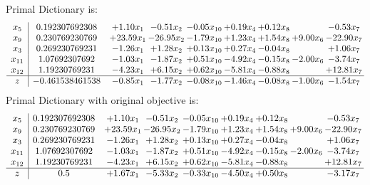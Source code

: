 \documentclass[9pt]{article}
\begin{document}
Primal Dictionary is:
\[\begin{array}{c| c c@{\hskip 2pt} c@{\hskip 2pt} c@{\hskip 2pt} c@{\hskip 2pt} c@{\hskip 2pt} c@{\hskip 2pt} c@{\hskip 2pt} }
 x_{5}   &  0.192307692308 & +  1.10 x_{1} & -0.51 x_{2} & -0.05 x_{10} & +  0.19 x_{4} & +  0.12 x_{8} &   & -0.53 x_{7}\\
 x_{9}   &  0.230769230769 & + 23.59 x_{1} & -26.95 x_{2} & -1.79 x_{10} & +  1.23 x_{4} & +  1.54 x_{8} & +  9.00 x_{6} & -22.90 x_{7}\\
 x_{3}   &  0.269230769231 & -1.26 x_{1} & +  1.28 x_{2} & +  0.13 x_{10} & +  0.27 x_{4} & -0.04 x_{8} &   & +  1.06 x_{7}\\
 x_{11}   &  1.07692307692 & -1.03 x_{1} & -1.87 x_{2} & +  0.51 x_{10} & -4.92 x_{4} & -0.15 x_{8} & -2.00 x_{6} & -3.74 x_{7}\\
 x_{12}   &  1.19230769231 & -4.23 x_{1} & +  6.15 x_{2} & +  0.62 x_{10} & -5.81 x_{4} & -0.88 x_{8} &   & + 12.81 x_{7}\\
\hline
z    &  -0.461538461538 & -0.85 x_{1} & -1.77 x_{2} & -0.08 x_{10} & -1.46 x_{4} & -0.08 x_{8} & -1.00 x_{6} & -1.54 x_{7}\\
\end{array}\]
Primal Dictionary with original objective is:
\[\begin{array}{c| c c@{\hskip 2pt} c@{\hskip 2pt} c@{\hskip 2pt} c@{\hskip 2pt} c@{\hskip 2pt} c@{\hskip 2pt} c@{\hskip 2pt} }
 x_{5}   &  0.192307692308 & +  1.10 x_{1} & -0.51 x_{2} & -0.05 x_{10} & +  0.19 x_{4} & +  0.12 x_{8} &   & -0.53 x_{7}\\
 x_{9}   &  0.230769230769 & + 23.59 x_{1} & -26.95 x_{2} & -1.79 x_{10} & +  1.23 x_{4} & +  1.54 x_{8} & +  9.00 x_{6} & -22.90 x_{7}\\
 x_{3}   &  0.269230769231 & -1.26 x_{1} & +  1.28 x_{2} & +  0.13 x_{10} & +  0.27 x_{4} & -0.04 x_{8} &   & +  1.06 x_{7}\\
 x_{11}   &  1.07692307692 & -1.03 x_{1} & -1.87 x_{2} & +  0.51 x_{10} & -4.92 x_{4} & -0.15 x_{8} & -2.00 x_{6} & -3.74 x_{7}\\
 x_{12}   &  1.19230769231 & -4.23 x_{1} & +  6.15 x_{2} & +  0.62 x_{10} & -5.81 x_{4} & -0.88 x_{8} &   & + 12.81 x_{7}\\
\hline
z    &  0.5 & +  1.67 x_{1} & -5.33 x_{2} & -0.33 x_{10} & -4.50 x_{4} & +  0.50 x_{8} &   & -3.17 x_{7}\\
\end{array}\]
\end{document}
